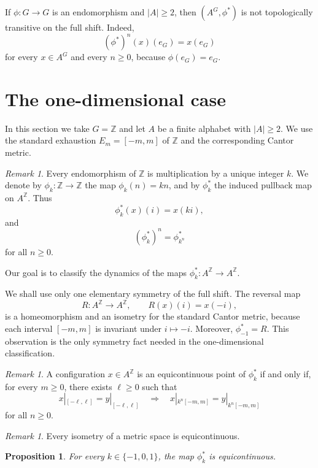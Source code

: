 \documentclass[12pt,a4paper]{article}
\newtheorem{proposition}[theorem]{Proposition}
\theoremstyle{definition}
\theoremstyle{remark}
\newtheorem{remark}[theorem]{Remark}
\newcommand{\ZZ}{\mathbb{Z}}
\begin{document}
If $\phi:G\to G$ is an endomorphism and $|A|\geq 2$, then $(A^G,\phi^*)$ is not topologically transitive on the full shift. Indeed,
\[
(\phi^*)^n(x)(e_G)=x(e_G)
\]
for every $x\in A^G$ and every $n\geq 0$, because $\phi(e_G)=e_G$.



\section{The one-dimensional case}\label{sec:one-dimensional-case}

In this section we take $G=\ZZ$ and let $A$ be a finite alphabet with $|A|\geq 2$. We use the standard exhaustion $E_m=[-m,m]$ of $\ZZ$ and the corresponding Cantor metric. 

\begin{remark}\label{rem:integer-endomorphisms}
Every endomorphism of $\ZZ$ is multiplication by a unique integer $k$. We denote by $\phi_k:\ZZ\to\ZZ$ the map $\phi_k(n)=kn$, and by $\phi_k^*$ the induced pullback map on $A^\ZZ$. Thus
\[
\phi_k^*(x)(i)=x(ki),
\]
and
\[
(\phi_k^*)^n=\phi_{k^n}^*
\]
for all $n\geq 0$.
\end{remark}

Our goal is to classify the dynamics of the maps $\phi_k^*:A^\ZZ\to A^\ZZ$.

We shall use only one elementary symmetry of the full shift. The reversal map
\[
R:A^\ZZ\to A^\ZZ,\qquad R(x)(i)=x(-i),
\]
is a homeomorphism and an isometry for the standard Cantor metric, because each interval $[-m,m]$ is invariant under $i\mapsto -i$. Moreover, $\phi_{-1}^*=R$. This observation is the only symmetry fact needed in the one-dimensional classification.

\begin{remark}\label{rem:combinatorial-equicontinuity}
A configuration $x\in A^\ZZ$ is an equicontinuous point of $\phi_k^*$ if and only if, for every $m\geq 0$, there exists $\ell\geq 0$ such that
\[
x|_{[-\ell,\ell]}=y|_{[-\ell,\ell]}
\quad\Longrightarrow\quad
x|_{k^n[-m,m]}=y|_{k^n[-m,m]}
\]
for all $n\geq 0$.
\end{remark}

\begin{remark}\label{rem:isometry-equicontinuous}
Every isometry of a metric space is equicontinuous.
\end{remark}

\begin{proposition}\label{prop:trivial-a-equicontinuous}
For every $k\in\{-1,0,1\}$, the map $\phi_k^*$ is equicontinuous.
\end{proposition}
\end{document}
